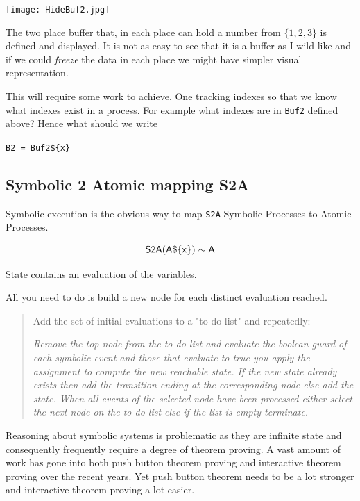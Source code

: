 \documentclass[]{article}
\begin{document}
{\begin{minipage}{0.4\textwidth}
\begin{center}
\texttt{[image: HideBuf2.jpg]}\end{center}
\end{minipage}

The two place buffer that, in each place can hold a number from $\{1,2,3\}$ is defined and displayed.  It is not as easy to see that it is a buffer as I wild like and if we could \emph{freeze} the data in each place we might have simpler visual representation.


This will require some work to achieve.  One tracking  indexes so that we know what indexes exist in a process. For example what indexes are in \verb|Buf2| defined above? Hence what should we write

\verb|B2 = Buf2${x}|
}



\subsection{Symbolic 2 Atomic mapping S2A}
Symbolic execution  is the obvious way  to  map \verb|S2A|  Symbolic Processes  to  Atomic Processes.

\[{\sf S2A(A\$\{x\})\sim  A }\]

State contains  an evaluation of the variables.


All you need to do is build a new node for each distinct evaluation reached.

 \begin{quote}
 Add  the set of initial evaluations to a "to do list" and repeatedly:

 \emph{Remove the top node from the to do list and evaluate the boolean guard of each  symbolic event and those that evaluate to true you apply the assignment to compute the new reachable state. If the new state already exists then add the transition ending at the corresponding  node else add the state.  When  all events of the selected node have been processed either select the next node on the to do list else if the list is empty terminate.  }
 \end{quote}




Reasoning about symbolic systems is problematic as they are infinite state and consequently frequently require a degree of theorem proving. A vast amount of work has gone into both push button theorem proving and interactive theorem proving over the recent years.  Yet push button theorem needs to be a lot stronger and interactive theorem proving a lot easier.
\end{document}

